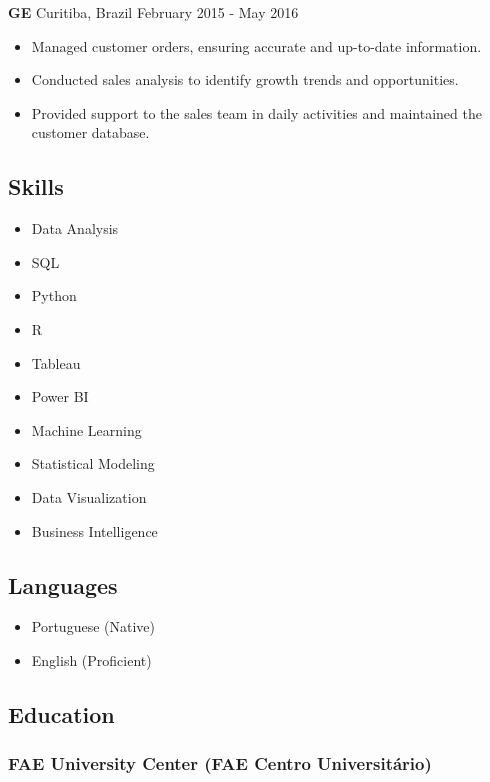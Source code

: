 \documentclass[
]{article}
\providecommand{\tightlist}{%
  \setlength{\itemsep}{0pt}\setlength{\parskip}{0pt}}
\begin{document}
\textbf{GE} \textbar{} Curitiba, Brazil \textbar{} February 2015 - May
2016

\begin{itemize}
\tightlist
\item
  Managed customer orders, ensuring accurate and up-to-date information.
\item
  Conducted sales analysis to identify growth trends and opportunities.
\item
  Provided support to the sales team in daily activities and maintained
  the customer database.
\end{itemize}

\subsection{Skills}\label{skills}

\begin{itemize}
\tightlist
\item
  Data Analysis
\item
  SQL
\item
  Python
\item
  R
\item
  Tableau
\item
  Power BI
\item
  Machine Learning
\item
  Statistical Modeling
\item
  Data Visualization
\item
  Business Intelligence
\end{itemize}

\subsection{Languages}\label{languages}

\begin{itemize}
\tightlist
\item
  Portuguese (Native)
\item
  English (Proficient)
\end{itemize}

\subsection{Education}\label{education}

\subsubsection{FAE University Center (FAE Centro
Universitário)}\label{fae-university-center-fae-centro-universituxe1rio}
\end{document}
